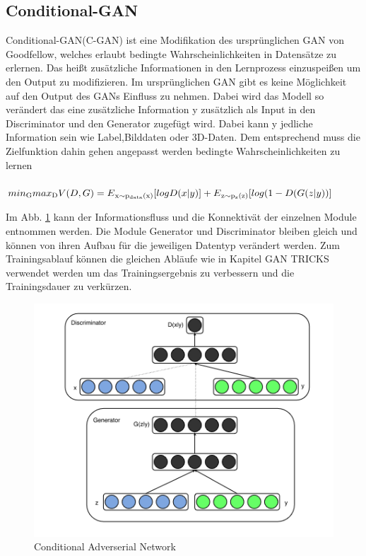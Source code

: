\documentclass{llncs}
\begin{document}
\subsection{Conditional-GAN}

Conditional-GAN(C-GAN) ist eine Modifikation des ursprünglichen GAN von Goodfellow, welches erlaubt bedingte Wahrscheinlichkeiten in Datensätze zu erlernen. Das heißt zusätzliche Informationen in den Lernprozess einzuspeißen um den Output zu modifizieren. Im ursprünglichen GAN gibt es keine Möglichkeit auf den Output des GANs Einfluss zu nehmen. Dabei wird das Modell so verändert das eine zusätzliche Information y zusätzlich als Input in den Discriminator und den Generator zugefügt wird. Dabei kann y jedliche Information sein wie Label,Bilddaten oder 3D-Daten. Dem entsprechend muss die Zielfunktion dahin gehen angepasst werden bedingte Wahrscheinlichkeiten zu lernen
\\\\
\begin{math}
min\textsubscript{G} max\textsubscript{D}V(D,G)=E\textsubscript{x$\sim$p\textsubscript{data}(x)}[logD(x|y)]  + E\textsubscript{z$\sim$p\textsubscript{z}(z)}[log(1-D(G(z|y))]
\\\\             
\end{math}

Im Abb. \ref{fig:Bild20} kann der Informationsfluss und die Konnektivät der einzelnen Module entnommen werden. Die Module Generator und Discriminator bleiben gleich und können von ihren Aufbau für die jeweiligen Datentyp verändert werden. Zum Trainingsablauf können die gleichen Abläufe wie in Kapitel GAN TRICKS verwendet werden um das Trainingsergebnis zu verbessern und die Trainingsdauer zu verkürzen. 

\begin{figure}[htbp] 
	\centering
	\includegraphics[width=1.2\textwidth]{cgan.png}
	\caption{Conditional Adverserial Network}
	\label{fig:Bild20}
\end{figure}
\end{document}
